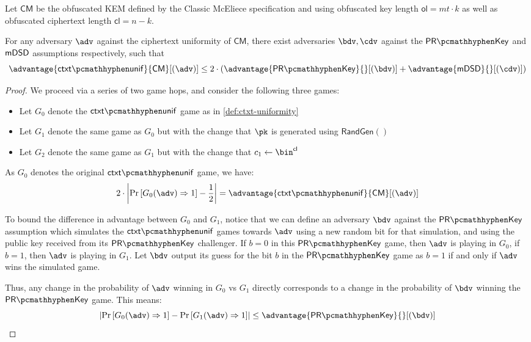\begin{lemma}
\label{lem:classic-mceliece-ctxt-unif}
    Let $\mathsf{CM}$ be the obfuscated KEM defined by the Classic McEliece specification \cite{NISTPQC-R4:ClassicMcEliece22} and using obfuscated key length $\mathsf{ol} = mt \cdot k$ as well as obfuscated ciphertext length $\mathsf{cl} = n-k$.
    
    For any adversary $\adv$ against the ciphertext uniformity of $\mathsf{CM}$, there exist adversaries $\bdv, \cdv$ against the $\prkey$ and $\mathsf{mDSD}$ assumptions respectively, such that
    \[ \advantage{\ctxtunif}{\mathsf{CM}}[(\adv)] \leq 2 \cdot \left( \advantage{\prkey}{}[(\bdv)] + \advantage{\mdsd}{}[(\cdv)] \right) \]
\end{lemma}
\begin{proof}
    We proceed via a series of two game hops, and consider the following three games:
    \begin{itemize}
        \item Let $G_0$ denote the $\ctxtunif$ game as in \cref{def:ctxt-uniformity}
        \item Let $G_1$ denote the same game as $G_0$ but with the change that $\pk$ is generated using $\textsf{RandGen}()$
        \item Let $G_2$ denote the same game as $G_1$ but with the change that $c_1 \gets \bin^\mathsf{cl}$
    \end{itemize}

    As $G_0$ denotes the original $\ctxtunif$ game, we have:
    \[ 2 \cdot \left| \Pr\left[G_0(\adv) \Rightarrow 1\right] - \frac{1}{2} \right| = \advantage{\ctxtunif}{\mathsf{CM}}[(\adv)] \]

    To bound the difference in advantage between $G_0$ and $G_1$, notice that we can define an adversary $\bdv$ against the $\prkey$ assumption which simulates the $\ctxtunif$ games towards $\adv$ using a new random bit for that simulation, and using the public key received from its $\prkey$ challenger. If $b=0$ in this $\prkey$ game, then $\adv$ is playing in $G_0$, if $b=1$, then $\adv$ is playing in $G_1$. Let $\bdv$ output its guess for the bit $b$ in the $\prkey$ game as $b=1$ if and only if $\adv$ wins the simulated game.

    Thus, any change in the probability of $\adv$ winning in $G_0$ vs $G_1$ directly corresponds to a change in the probability of $\bdv$ winning the $\prkey$ game. This means:
    \[ \left| \Pr\left[G_0(\adv) \Rightarrow 1\right] - \Pr\left[G_1(\adv) \Rightarrow 1\right] \right| \leq \advantage{\prkey}{}[(\bdv)] \]


\end{proof}
